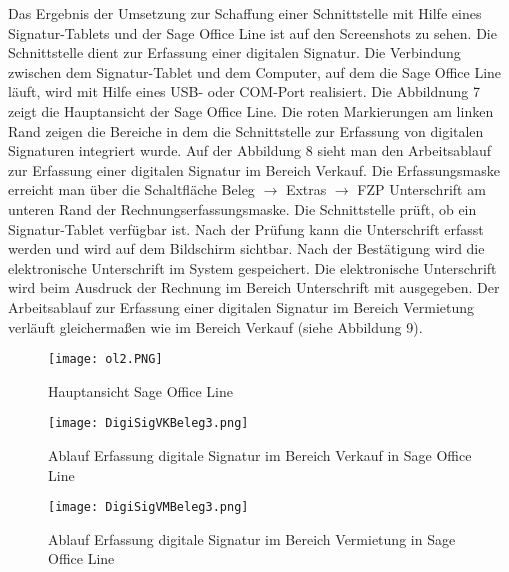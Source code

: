Das Ergebnis der Umsetzung zur Schaffung einer Schnittstelle mit Hilfe eines Signatur-Tablets und der Sage Office Line ist auf den Screenshots zu sehen. Die Schnittstelle dient zur Erfassung einer digitalen Signatur. Die Verbindung zwischen dem Signatur-Tablet und dem Computer, auf dem die Sage Office Line läuft, wird mit Hilfe eines USB- oder COM-Port realisiert. Die Abbildnung 7 zeigt die Hauptansicht der Sage Office Line. Die roten Markierungen am linken Rand zeigen die Bereiche in dem die Schnittstelle zur Erfassung von digitalen Signaturen integriert wurde. Auf der Abbildung 8 sieht man den Arbeitsablauf zur Erfassung einer digitalen Signatur im Bereich Verkauf. Die Erfassungsmaske erreicht man über die Schaltfläche Beleg $\rightarrow$ Extras $\rightarrow$ FZP Unterschrift am unteren Rand der Rechnungserfassungsmaske. Die Schnittstelle prüft, ob ein Signatur-Tablet verfügbar ist. Nach der Prüfung kann die Unterschrift erfasst werden und wird auf dem Bildschirm sichtbar. Nach der Bestätigung wird die elektronische Unterschrift im System gespeichert. Die elektronische Unterschrift wird beim Ausdruck der Rechnung im Bereich Unterschrift mit ausgegeben. Der Arbeitsablauf zur Erfassung einer digitalen Signatur im Bereich Vermietung verläuft gleichermaßen wie im Bereich Verkauf (siehe Abbildung 9).

\begin{figure}[!ht]
    \centering
    \texttt{[image: ol2.PNG]}
    \caption[Hauptansicht Sage Office Line]{\small{Hauptansicht Sage Office Line}}
\end{figure}

\begin{figure}[!ht]
    \centering
    \texttt{[image: DigiSigVKBeleg3.png]}
    \caption[Ablauf Erfassung digitale Signatur in Sage Office Line (Verkauf)]{\small{Ablauf Erfassung digitale Signatur im Bereich Verkauf in Sage Office Line}}
\end{figure}

\begin{figure}[!ht]
    \centering
    \texttt{[image: DigiSigVMBeleg3.png]}
    \caption[Ablauf Erfassung digitale Signatur in Sage Office Line (Vermietung)]{\small{Ablauf Erfassung digitale Signatur im Bereich Vermietung in Sage Office Line}}
\end{figure}